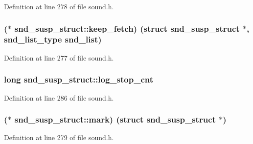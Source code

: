 Definition at line 278 of file sound.\+h.

\subsubsection[{\texorpdfstring{keep\+\_\+fetch}{keep_fetch}}]{($\ast$ snd\+\_\+susp\+\_\+struct\+::keep\+\_\+fetch) (struct {\bf snd\+\_\+susp\+\_\+struct} $\ast$, {\bf snd\+\_\+list\+\_\+type} snd\+\_\+list)}\hypertarget{structsnd__susp__struct_aef3e12bfaaf19ddbdb630ab20d40c3f7}{}\label{structsnd__susp__struct_aef3e12bfaaf19ddbdb630ab20d40c3f7}


Definition at line 277 of file sound.\+h.

\subsubsection[{\texorpdfstring{log\+\_\+stop\+\_\+cnt}{log_stop_cnt}}]{\setlength{\rightskip}{0pt plus 5cm}long snd\+\_\+susp\+\_\+struct\+::log\+\_\+stop\+\_\+cnt}\hypertarget{structsnd__susp__struct_a8044ae9d2cfcbccffd2a60c9b6ce16fa}{}\label{structsnd__susp__struct_a8044ae9d2cfcbccffd2a60c9b6ce16fa}


Definition at line 286 of file sound.\+h.

\subsubsection[{\texorpdfstring{mark}{mark}}]{($\ast$ snd\+\_\+susp\+\_\+struct\+::mark) (struct {\bf snd\+\_\+susp\+\_\+struct} $\ast$)}\hypertarget{structsnd__susp__struct_a077478e200df3bc42489892597f15d47}{}\label{structsnd__susp__struct_a077478e200df3bc42489892597f15d47}


Definition at line 279 of file sound.\+h.

